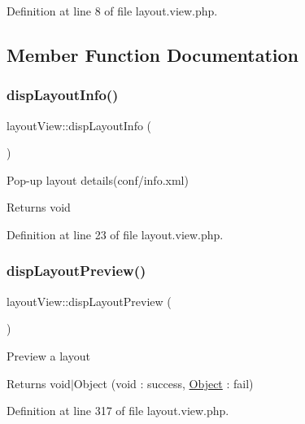 Definition at line 8 of file layout.\+view.\+php.



\subsection{Member Function Documentation}
\hypertarget{classlayoutView_a7e82f54644ad872c39e708449b6fea29}{}\label{classlayoutView_a7e82f54644ad872c39e708449b6fea29} 
\subsubsection{\texorpdfstring{disp\+Layout\+Info()}{dispLayoutInfo()}}
{\footnotesize\ttfamily layout\+View\+::disp\+Layout\+Info (\begin{DoxyParamCaption}{ }\end{DoxyParamCaption})}

Pop-\/up layout details(conf/info.\+xml) \begin{DoxyReturn}{Returns}
void 
\end{DoxyReturn}


Definition at line 23 of file layout.\+view.\+php.

\hypertarget{classlayoutView_ae61b21bdcf9e655ac2d1dab95ba96519}{}\label{classlayoutView_ae61b21bdcf9e655ac2d1dab95ba96519} 
\subsubsection{\texorpdfstring{disp\+Layout\+Preview()}{dispLayoutPreview()}}
{\footnotesize\ttfamily layout\+View\+::disp\+Layout\+Preview (\begin{DoxyParamCaption}{ }\end{DoxyParamCaption})}

Preview a layout \begin{DoxyReturn}{Returns}
void$\vert$\+Object (void \+: success, \hyperlink{classObject}{Object} \+: fail) 
\end{DoxyReturn}


Definition at line 317 of file layout.\+view.\+php.

\hypertarget{classlayoutView_a9d6c6bcdcf6ce58534d2f49f3fb89fce}{}\label{classlayoutView_a9d6c6bcdcf6ce58534d2f49f3fb89fce} 
